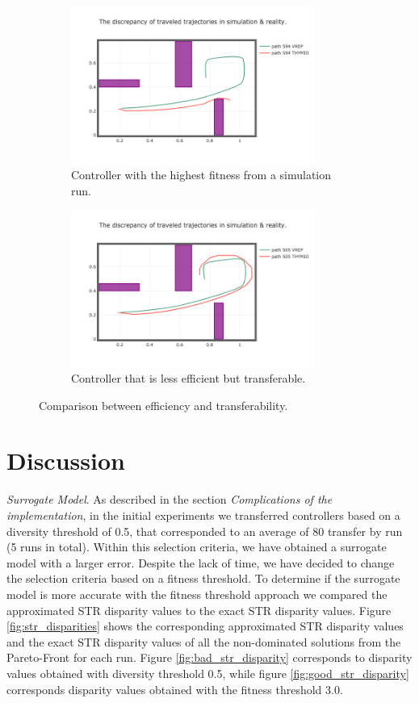 \begin{figure}[H]
    \centering
    \begin{subfigure}[b]{0.8\textwidth}
    	\centering
        \includegraphics[width=8cm]{include/images/fit_not_transferable.PNG}
        \caption{Controller with the highest fitness from a simulation run.}
        \label{fig:sim_bad_transfer}
    \end{subfigure}
    \begin{subfigure}[b]{0.8\textwidth}
    	\centering
        \includegraphics[width=8cm]{include/images/moea_sim_18_505.PNG}
        \caption{Controller that is less efficient but transferable.}
        \label{fig:sim_good_transfer}
    \end{subfigure}
    \caption{Comparison between efficiency and transferability.}
	\label{fig:comparison_efficiency_transferability}
\end{figure}


\section{Discussion}

\emph{Surrogate Model}. As described in the section \emph{Complications of the implementation}, in the initial experiments we transferred controllers based on a diversity threshold of 0.5, that corresponded to an average of 80 transfer by run (5 runs in total). Within this selection criteria, we have obtained a surrogate model with a larger error. Despite the lack of time, we have decided to change the selection criteria based on a fitness threshold. To determine if the surrogate model is more accurate with the fitness threshold approach we compared the approximated STR disparity values to the exact STR disparity values. Figure \ref{fig:str_disparities} shows the corresponding approximated STR disparity values and the exact STR disparity values of all the non-dominated solutions from the Pareto-Front for each run. Figure \ref{fig:bad_str_disparity} corresponds to disparity values obtained with diversity threshold 0.5, while figure \ref{fig:good_str_disparity} corresponds disparity values obtained with the fitness threshold 3.0.

